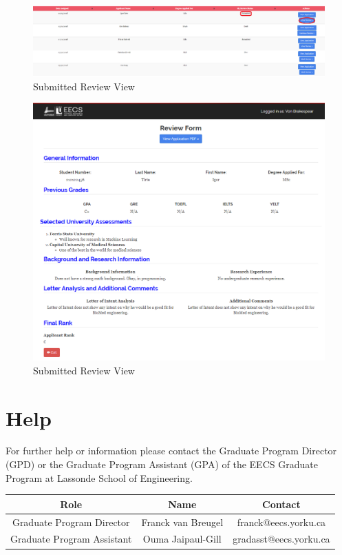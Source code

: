 \documentclass[fontsize=12pt,paper=letter,twoside]{scrartcl}
\begin{document}
\begin{figure}[!htb]
\begin{center}
\includegraphics[width=.8\textwidth]{images/cm/submitted_review.png}
\end{center}
\caption{Submitted Review View}
\label{fig:cm:submitted_review}
\end{figure}

\begin{figure}[!htb]
\begin{center}
\includegraphics[width=.8\textwidth]{images/cm/submit_review_view.png}
\end{center}
\caption{Submitted Review View}
\label{fig:cm:submit_review_view}
\end{figure}

\clearpage
\newpage
\section{Help}
For further help or information please contact the Graduate Program Director (GPD) or the Graduate Program Assistant (GPA) of the EECS Graduate Program at Lassonde School of Engineering.\\

\begin{center}
\begin{tabular}{ |c |c |c | } \hline
 \textbf{Role} & \textbf{Name} & \textbf{Contact} \\ \hline
 Graduate Program Director & Franck van Breugel & franck@eecs.yorku.ca \\ \hline
 Graduate Program Assistant & Ouma Jaipaul-Gill & gradasst@eecs.yorku.ca \\ \hline
\end{tabular}
\end{center}
\end{document}
